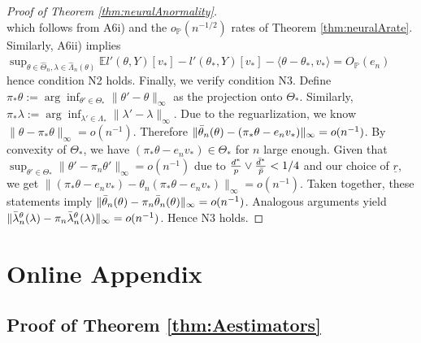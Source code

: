 \documentclass[12pt]{article}
\theoremstyle{myplain}
\theoremstyle{definition}
\theoremstyle{definition}
\theoremstyle{remark}
\numberwithin{equation}{section}
\begin{document}
\begin{proof}[Proof of Theorem \ref{thm:neuralAnormality}]
$$$$
which follows from A6i) and the $o_\mathbb{P}(n^{-1/2})$ rates of Theorem \ref{thm:neuralArate}. Similarly, A6ii) implies $\sup_{\theta\in\widehat{\Theta}_n,\lambda\in\widehat{\Lambda}_n(\theta)} \mathbb{E} l'(\theta,Y)[v_*]-l'(\theta_*, Y)[v_*] - \langle \theta-\theta_*, v_* \rangle =  O_\mathbb{P}(e_n)$ hence condition N2 holds. Finally, we verify condition N3. Define $\pi_*\theta:=\arg\inf_{\theta'\in\Theta_*}\|\theta'-\theta\|_\infty$ as the projection onto $\Theta_*$. Similarly, $\pi_*\lambda:=\arg\inf_{\lambda'\in\Lambda_*}\|\lambda'-\lambda\|_\infty$. Due to the reguarlization, we know $\|\theta-\pi_*\theta\|_\infty=o(n^{-1})$. Therefore $\|\Bar{\theta}_n(\theta)-(\pi_*\theta -e_nv_*)\|_\infty=o(n^{-1})$. By convexity of $\Theta_*$, we have $(\pi_*\theta -e_nv_*)\in\Theta_*$ for $n$ large enough. Given that $\sup_{\theta'\in\Theta_*}\|\theta'-\pi_n\theta'\|_\infty=o(n^{-1})$ due to $\frac{d^*}{p}\vee\frac{\Bar{d}^*}{\Bar{p}}<1/4$ and our choice of $\underline{r}$, we get $\|(\pi_*\theta -e_nv_*)-\theta_n(\pi_*\theta -e_nv_*)\|_\infty=o(n^{-1})$. Taken together, these statements imply $\|\Bar{\theta}_n(\theta)-\pi_n\Bar{\theta}_n(\theta)\|_\infty=o(n^{-1})$. Analogous arguments yield $\|\Bar{\lambda}_n^\theta(\lambda)-\pi_n\Bar{\lambda}_n^\theta(\lambda)\|_\infty=o(n^{-1})$. Hence N3 holds.
\end{proof}


\section{Online Appendix}\label{appendix:online}

\subsection{Proof of Theorem \ref{thm:Aestimators}}
\end{document}
